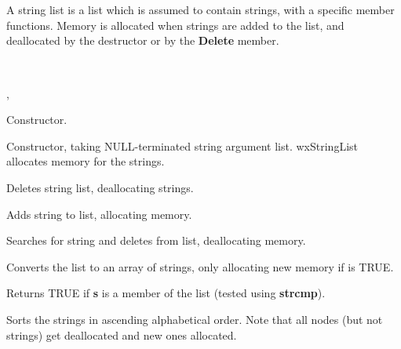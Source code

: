 \section{}\label{wxstringlist}

A string list is a list which is assumed to contain strings, with a
specific member functions. Memory is allocated when strings are added to
the list, and deallocated by the destructor or by the {\bf Delete}\rtfsp
member.


\\


, 




Constructor.


Constructor, taking NULL-terminated string argument list. wxStringList
allocates memory for the strings.



Deletes string list, deallocating strings.



Adds string to list, allocating memory.



Searches for string and deletes from list, deallocating memory.



Converts the list to an array of strings, only allocating new memory if
 is TRUE.



Returns TRUE if {\bf s} is a member of the list (tested using {\bf strcmp}).



Sorts the strings in ascending alphabetical order. Note that all nodes
(but not strings) get deallocated and new ones allocated.


